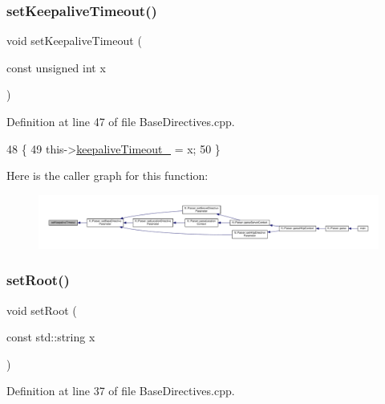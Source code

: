 \subsubsection{\texorpdfstring{set\+Keepalive\+Timeout()}{setKeepaliveTimeout()}}
{\footnotesize\ttfamily void set\+Keepalive\+Timeout (\begin{DoxyParamCaption}\item[{const unsigned int}]{x }\end{DoxyParamCaption})}



Definition at line 47 of file Base\+Directives.\+cpp.


\begin{DoxyCode}
48     \{
49         this->\hyperlink{classft_1_1_base_directives_aa1f5f394b428d0d18765a9b9e14e648f}{keepaliveTimeout\_} = x;
50     \}
\end{DoxyCode}
Here is the caller graph for this function\+:
\nopagebreak
\begin{figure}[H]
\begin{center}
\leavevmode
\includegraphics[width=350pt]{classft_1_1_base_directives_a0818b8529872ba9622329e2118d20c39_icgraph}
\end{center}
\end{figure}
\mbox{\label{classft_1_1_base_directives_a2a7990e309f7e38f2915dbbb0d2704cf}} 
\subsubsection{\texorpdfstring{set\+Root()}{setRoot()}}
{\footnotesize\ttfamily void set\+Root (\begin{DoxyParamCaption}\item[{const std\+::string}]{x }\end{DoxyParamCaption})}



Definition at line 37 of file Base\+Directives.\+cpp.


